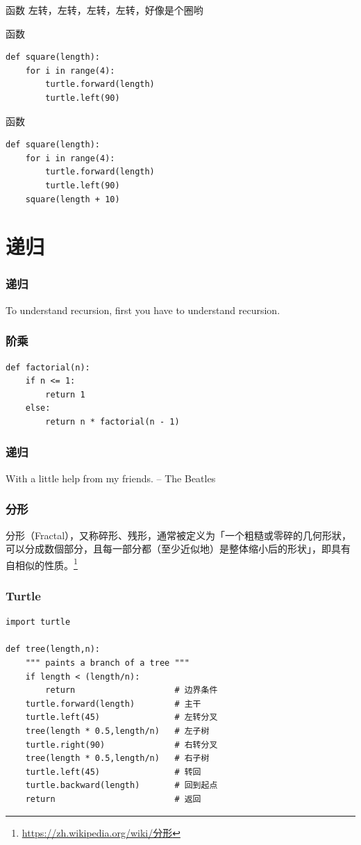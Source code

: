\documentclass{beamer}
\begin{document}
\begin{frame}{函数}
	\huge
	左转，左转，左转，左转，好像是个圈哟
\end{frame}
\begin{frame}[t,fragile]{函数}
\begin{verbatim}
def square(length):
    for i in range(4):
        turtle.forward(length)
        turtle.left(90)
\end{verbatim}
\end{frame}

\begin{frame}[t,fragile]{函数}
\begin{verbatim}
def square(length):
    for i in range(4):
        turtle.forward(length)
        turtle.left(90)
    square(length + 10)
\end{verbatim}
	
\end{frame}
\section{递归} %
\label{sec:递归}
\begin{frame}
  \frametitle{递归}
	\huge
	To understand recursion, first you have to understand recursion.
\end{frame}

\begin{frame}[fragile]
  \frametitle{阶乘}
\begin{verbatim}
def factorial(n):
    if n <= 1:
        return 1
    else:
        return n * factorial(n - 1)
\end{verbatim}
\end{frame}

\begin{frame}
  \frametitle{递归}
	\huge
	With a little help from my friends.
	\large
	\flushright
	-- The Beatles
\end{frame}
\begin{frame}
  \frametitle{分形}
	分形（Fractal），又称碎形、残形，通常被定义为「一个粗糙或零碎的几何形狀，可以分成数個部分，且每一部分都（至少近似地）是整体缩小后的形状」，即具有自相似的性质。\footnote{\url{https://zh.wikipedia.org/wiki/分形}}
\end{frame}
\begin{frame}[fragile]
  \frametitle{Turtle}
\begin{verbatim}
import turtle

def tree(length,n):
    """ paints a branch of a tree """
    if length < (length/n):
        return                    # 边界条件
    turtle.forward(length)        # 主干
    turtle.left(45)               # 左转分叉 
    tree(length * 0.5,length/n)   # 左子树
    turtle.right(90)              # 右转分叉
    tree(length * 0.5,length/n)   # 右子树
    turtle.left(45)               # 转回
    turtle.backward(length)       # 回到起点
    return                        # 返回
\end{verbatim}
\end{frame}
\end{document}
